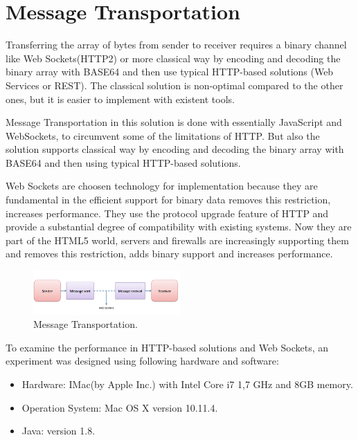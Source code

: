 \section{Message Transportation}
\label{section:messageTransfer}

Transferring the array of bytes from sender to receiver requires a binary channel like Web Sockets(HTTP2) or
more classical way by encoding and decoding the binary array with BASE64 and then use typical HTTP-based
solutions (Web Services or REST). The classical solution is non-optimal compared to the other ones, but it is easier to implement with existent tools.

Message Transportation in this solution is done with essentially JavaScript and WebSockets, to circumvent some of the limitations of HTTP. But also the solution supports classical way by encoding and decoding the binary array with BASE64 and then using typical HTTP-based solutions.

Web Sockets are choosen technology for implementation because they are fundamental in the efficient support for binary data removes this restriction, increases performance. They use the protocol upgrade feature of HTTP and
provide a substantial degree of compatibility with existing systems. Now they are part of the HTML5 world, servers and firewalls are increasingly supporting them and removes this restriction, adds binary support and increases performance.

\begin{figure}[!htb]
  \centering
  \includegraphics[width=0.5\textwidth]{Figures/websocket.png}
  \caption[Message Transportation.]{Message Transportation.}
  \label{fig:websocket}
\end{figure}

To examine the performance in HTTP-based solutions and Web Sockets, an experiment was designed using following hardware and software:

\begin{itemize}
\item 	Hardware: IMac(by Apple Inc.) with Intel Core i7 1,7 GHz and 8GB memory.
\item 	Operation System: Mac OS X version 10.11.4.
\item 	Java: version 1.8.
\end{itemize}

